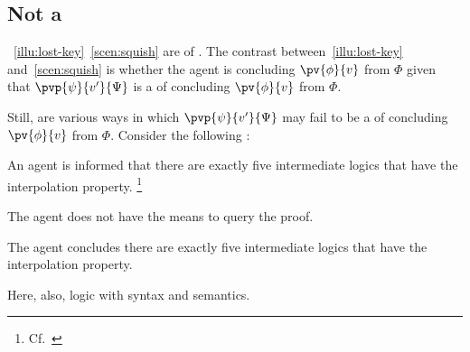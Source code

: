 \subsection{Not a \requ{}}
\label{sec:not-requ}

\begin{note}
  ~\ref{illu:lost-key}~\ref{scen:squish} are  of .
  The contrast between~\ref{illu:lost-key} and~\ref{scen:squish} is whether the agent is concluding \(\pv{\phi}{v}\) from \(\Phi\) given that \(\pvp{\psi}{v'}{\Psi}\) is a \requ{} of concluding \(\pv{\phi}{v}\) from \(\Phi\).

  Still,  are various ways in which \(\pvp{\psi}{v'}{\Psi}\) may fail to be a  of concluding \(\pv{\phi}{v}\) from \(\Phi\).
  Consider the following :

  \begin{scenario}
    \label{illu:testimony-layperson}
    An agent is informed that there are exactly five intermediate logics that have the interpolation property.%
    \footnote{Cf.\ \textcite{Maksimova:1977un}}
  \end{scenario}

  The agent does not have the means to query the proof.

    The agent concludes there are exactly five intermediate logics that have the interpolation property.

  Here, also, logic with syntax and semantics.
\end{note}






